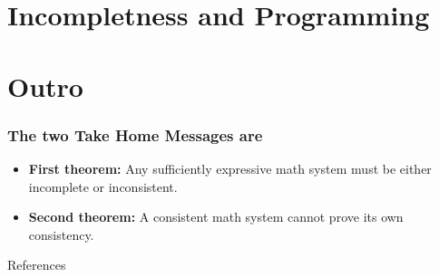 \documentclass[aspectratio=169]{beamer}
\begin{document}
\section{Incompletness and Programming}

\section{Outro}
\begin{frame}
	\frametitle{The two Take Home Messages are}
	\begin{itemize}
		\item \textbf{First theorem:} Any sufficiently expressive math system must be either incomplete or inconsistent.
		\item \textbf{Second theorem:} A consistent math system cannot prove its own consistency.
	\end{itemize}
\end{frame}
\begin{frame}{References}
    
    
\end{frame}
\end{document}
